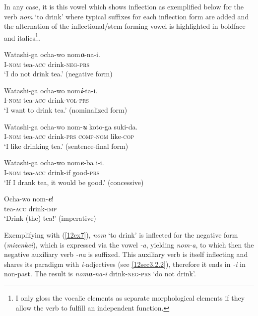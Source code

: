 \documentclass[output=paper,colorlinks,citecolor=brown]{langscibook}
\begin{document}
\largerpage[-1.5]

In any case, it is this vowel which shows inflection as exemplified below for the verb \emph{nom} `to drink' where typical suffixes for each inflection form are added and the alternation of the inflectional/stem forming vowel is highlighted in boldface and italics\footnote{I only gloss the vocalic elements as separate morphological elements if they allow the verb to fulfill an independent function.}.

\begin{exe}
	\ex \label{12ex7}
	\gll Watashi-ga ocha-wo nom\textbf{\emph{a}}-na-i. \\
	I-\textsc{nom} tea-\textsc{acc} drink-\textsc{neg-prs} \\
	\trans `I do not drink tea.' \hfill (negative form)
	
	\ex \label{12ex8}
	\gll Watashi-ga ocha-wo nom\textbf{\emph{i}}-ta-i. \\
	I-\textsc{nom} tea-\textsc{acc} drink-\textsc{vol-prs} \\
	\trans `I want to drink tea.' \hfill (nominalized form)
	
	\ex \label{12ex9}
	\gll Watashi-ga ocha-wo nom-\textbf{\emph{u}} koto-ga suki-da. \\
	I-\textsc{nom} tea-\textsc{acc} drink-\textsc{prs} \textsc{comp-nom} like-\textsc{cop} \\
	\trans `I like drinking tea.' \hfill (sentence-final form)
	
	\ex \label{12ex10}
	\gll Watashi-ga ocha-wo nom\textbf{\emph{e}}-ba i-i. \\
	I-\textsc{nom} tea-\textsc{acc} drink-if good-\textsc{prs} \\
	\trans `If I drank tea, it would be good.' \hfill (concessive)
	
	\ex \label{12ex11}
	\gll Ocha-wo nom-\textbf{\emph{e}}! \\
	tea-\textsc{acc} drink-\textsc{imp} \\
	\trans `Drink (the) tea!' \hfill (imperative)
\end{exe}

Exemplifying with (\ref{12ex7}), \emph{nom} `to drink' is inflected for the negative form (\emph{mizenkei}), which is expressed via the vowel \emph{-a}, yielding \emph{nom-a}, to which then the negative auxiliary verb \emph{-na} is suffixed. This auxiliary verb is itself inflecting and shares its paradigm with \emph{i-}adjectives (see \ref{12sec3.2.2}), therefore it ends in \emph{-i} in non-past. The result is \emph{nom\textbf{a}-na-i} drink-\textsc{neg-prs} `do not drink'.
\end{document}
